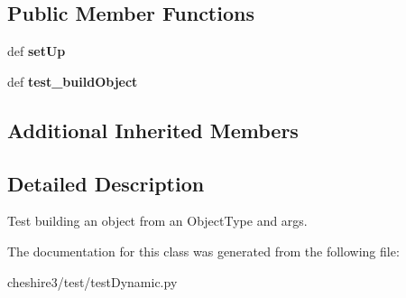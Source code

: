 \subsection*{Public Member Functions}
\begin{DoxyCompactItemize}
\item 
\hypertarget{classcheshire3_1_1test_1_1test_dynamic_1_1_build_object_test_case_aaaba4c8af2e609dbd006ad811bcb1cc3}{def {\bfseries set\-Up}}\label{classcheshire3_1_1test_1_1test_dynamic_1_1_build_object_test_case_aaaba4c8af2e609dbd006ad811bcb1cc3}

\item 
\hypertarget{classcheshire3_1_1test_1_1test_dynamic_1_1_build_object_test_case_a773dab5ffc9499323149ecc3f1f38644}{def {\bfseries test\-\_\-build\-Object}}\label{classcheshire3_1_1test_1_1test_dynamic_1_1_build_object_test_case_a773dab5ffc9499323149ecc3f1f38644}

\end{DoxyCompactItemize}
\subsection*{Additional Inherited Members}


\subsection{Detailed Description}
\begin{DoxyVerb}Test building an object from an ObjectType and args.\end{DoxyVerb}
 

The documentation for this class was generated from the following file\-:\begin{DoxyCompactItemize}
\item 
cheshire3/test/test\-Dynamic.\-py\end{DoxyCompactItemize}

